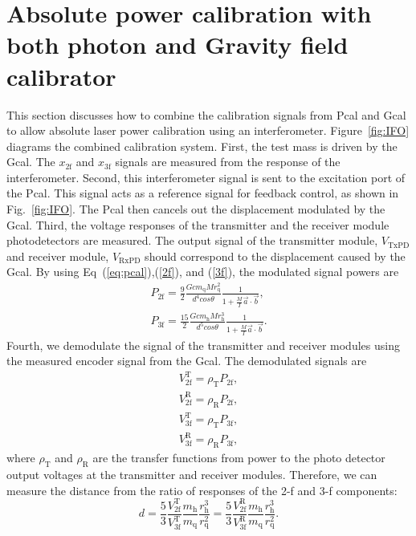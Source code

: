 \documentclass[%
 reprint,
superscriptaddress,
 amsmath,amssymb,
 aps,
]{revtex4-1}
\begin{document}
\section{Absolute power calibration with both photon and Gravity field calibrator} \label{sec:PGCAL}
This section discusses how to combine the calibration signals from Pcal and Gcal to allow absolute laser power calibration using an interferometer. 
Figure~\ref{fig:IFO} diagrams the combined calibration system.
First, the test mass is driven by the Gcal. The $x_{\mathrm{2f}}$ and $x_{\mathrm{3f}}$ signals are measured from the response of the interferometer. Second, this interferometer signal is sent to the excitation port of the Pcal. This signal acts as a reference signal for feedback control, as shown in Fig.~\ref{fig:IFO}. The Pcal then cancels out the displacement modulated by the Gcal. 
Third, the voltage responses of the transmitter and the receiver module photodetectors are measured. The output signal of the transmitter module, $V_{\mathrm{TxPD}}$ and receiver module, $V_{\mathrm{RxPD}}$ should correspond to the displacement caused by the Gcal. By using Eq~(\ref{eq:pcal}),(\ref{2f}), and (\ref{3f}), the modulated signal powers are
\begin{eqnarray}
 P_{\mathrm{2f}}=\frac{9}{2} \frac{Gcm_{\mathrm{q}}Mr_{\mathrm{q}}^2}{d^4cos\theta}\frac{1}{1+\frac{M}{I}\vec{a}\cdot \vec{b}}, \label{P2f} \\
 P_{\mathrm{3f}}= \frac{15}{2}\frac{Gcm_{\mathrm{h}}Mr_{\mathrm{h}}^3}{d^5cos\theta}\frac{1}{1+\frac{M}{I}\vec{a}\cdot \vec{b}}. \label{P3f}
\end{eqnarray}
Fourth, we demodulate the signal of the transmitter and receiver modules using the measured encoder signal from the Gcal.
The demodulated signals are 
\begin{eqnarray}
V_{\mathrm{2f}}^{\mathrm{T}}=\rho_{\mathrm{T}}P_{\mathrm{2f}}, \\
V_{\mathrm{2f}}^{\mathrm{R}}=\rho_{\mathrm{R}}P_{\mathrm{2f}}, \\
V_{\mathrm{3f}}^{\mathrm{T}}=\rho_{\mathrm{T}}P_{\mathrm{3f}}, \\
V_{\mathrm{3f}}^{\mathrm{R}}=\rho_{\mathrm{R}}P_{\mathrm{3f}}, 
\end{eqnarray} 
where $\rho_{\mathrm{T}}$ and $\rho_{\mathrm{R}}$ are the transfer functions from power to the photo detector output voltages at the transmitter and receiver modules.
Therefore, we can measure the distance from the ratio of responses of the 2-f and 3-f components: 
\begin{equation}
d=\frac{5}{3} \frac{V_{\mathrm{2f}}^{\mathrm{T}}}{V_{\mathrm{3f}}^{\mathrm{T}}}\frac{m_{\mathrm{h}}}{m_{\mathrm{q}}}\frac{r_{\mathrm{h}}^{3}}{r_{\mathrm{q}}^{2}}=\frac{5}{3} \frac{V_{\mathrm{2f}}^{\mathrm{R}}}{V_{\mathrm{3f}}^{\mathrm{R}}} \frac{m_{\mathrm{h}}}{m_{\mathrm{q}}}\frac{r_{\mathrm{h}}^{3}}{r_{\mathrm{q}}^{2}}. \label{d}
\end{equation}
\end{document}

